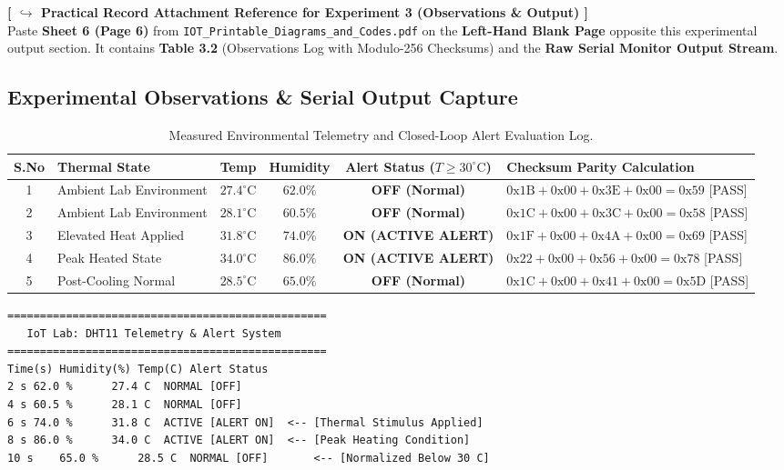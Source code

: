 \documentclass[11pt,a4paper]{article}
\begin{document}
\begin{attachmentbox}
\footnotesize
\textbf{[ $\hookrightarrow$ Practical Record Attachment Reference for Experiment 3 (Observations \& Output) ]}\\
Paste \textbf{Sheet 6 (Page 6)} from \texttt{IOT\_Printable\_Diagrams\_and\_Codes.pdf} on the \textbf{Left-Hand Blank Page} opposite this experimental output section. It contains \textbf{Table 3.2} (Observations Log with Modulo-256 Checksums) and the \textbf{Raw Serial Monitor Output Stream}.
\end{attachmentbox}

\subsection{Experimental Observations \& Serial Output Capture}
\begin{table}[H]
\centering
\small
\renewcommand{\arraystretch}{1.35}
\begin{tabularx}{\textwidth}{|c|p{3.2cm}|c|c|c|X|}
\hline
\textbf{S.No} & \textbf{Thermal State} & \textbf{Temp} & \textbf{Humidity} & \textbf{Alert Status ($T \ge 30^\circ\text{C}$)} & \textbf{Checksum Parity Calculation} \\
\hline
1 & Ambient Lab Environment & $27.4^\circ\text{C}$ & $62.0\%$ & \textbf{OFF (Normal)} & $\text{0x1B} + \text{0x00} + \text{0x3E} + \text{0x00} = \text{0x59}$ [PASS] \\
2 & Ambient Lab Environment & $28.1^\circ\text{C}$ & $60.5\%$ & \textbf{OFF (Normal)} & $\text{0x1C} + \text{0x00} + \text{0x3C} + \text{0x00} = \text{0x58}$ [PASS] \\
3 & Elevated Heat Applied & $31.8^\circ\text{C}$ & $74.0\%$ & \textbf{ON (ACTIVE ALERT)} & $\text{0x1F} + \text{0x00} + \text{0x4A} + \text{0x00} = \text{0x69}$ [PASS] \\
4 & Peak Heated State & $34.0^\circ\text{C}$ & $86.0\%$ & \textbf{ON (ACTIVE ALERT)} & $\text{0x22} + \text{0x00} + \text{0x56} + \text{0x00} = \text{0x78}$ [PASS] \\
5 & Post-Cooling Normal & $28.5^\circ\text{C}$ & $65.0\%$ & \textbf{OFF (Normal)} & $\text{0x1C} + \text{0x00} + \text{0x41} + \text{0x00} = \text{0x5D}$ [PASS] \\
\hline
\end{tabularx}
\caption{Measured Environmental Telemetry and Closed-Loop Alert Evaluation Log.}
\label{tab:exp3_log}
\end{table}

\begin{lstlisting}[style=bwTerminal, caption={Raw Serial Monitor Output Stream (9600 Baud).}]
=================================================
   IoT Lab: DHT11 Telemetry & Alert System       
=================================================
Time(s)	Humidity(%)	Temp(C)	Alert Status
2 s	62.0 %		27.4 C	NORMAL [OFF]
4 s	60.5 %		28.1 C	NORMAL [OFF]
6 s	74.0 %		31.8 C	ACTIVE [ALERT ON]  <-- [Thermal Stimulus Applied]
8 s	86.0 %		34.0 C	ACTIVE [ALERT ON]  <-- [Peak Heating Condition]
10 s	65.0 %		28.5 C	NORMAL [OFF]       <-- [Normalized Below 30 C]
\end{lstlisting}
\end{document}
